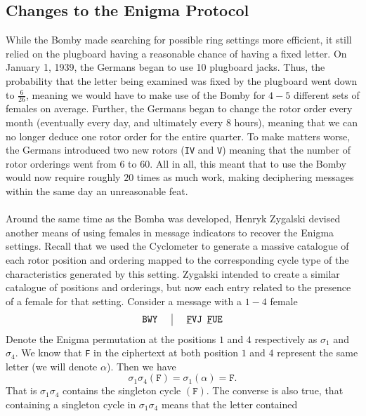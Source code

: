 \subsection{Changes to the Enigma Protocol}
While the Bomby made searching for possible ring settings more
efficient, it still relied on the plugboard having a reasonable
chance of having a fixed letter. On January 1, 1939, the Germans
began to use 10 plugboard jacks. Thus, the probability that the letter
being examined was fixed by the plugboard went down to $\frac{6}{26}$,
meaning we would have to make use of the Bomby for $4-5$ different
sets of females on average. Further, the Germans began to change the
rotor order every month (eventually every day, and ultimately
every 8 hours), meaning that we can no longer deduce one rotor order
for the entire quarter. To make matters worse, the Germans introduced
two new rotors (\texttt{IV} and \texttt{V}) meaning that the number
of rotor orderings went from $6$ to $60$. All in all, this meant that
to use the Bomby would now require roughly $20$ times as much work,
making deciphering messages within the same day an unreasonable feat.
\\\\Around the same time as the Bomba was developed, Henryk Zygalski
devised another means of using females in message indicators to
recover the Enigma settings. Recall that we used the Cyclometer to
generate a massive catalogue of each rotor position and ordering
mapped to the corresponding cycle type of the characteristics generated by
this setting. Zygalski intended to create a similar catalogue of
positions and orderings, but now each entry related to the presence of
a female for that setting. Consider a message with a $1-4$ female
\[
  \setlength{\arraycolsep}{15pt}
  \begin{array}{c | c}
    \texttt{BWY} & {\uline{\texttt{F}}}\texttt{VJ
    }{\uline{\texttt{F}}}\texttt{UE}              \\
  \end{array}
\]
Denote the Enigma permutation at the positions $1$ and $4$
respectively as $\sigma_1$ and $\sigma_4$. We know that \texttt{F} in
the ciphertext at both position $1$ and $4$ represent the same letter
(we will denote $\alpha$). Then we have
\[
  \sigma_1\sigma_4(\texttt{F}) = \sigma_1(\alpha) = \texttt{F}.
\]
That is $\sigma_1\sigma_4$ contains the singleton cycle
$(\texttt{F})$. The converse is also true, that containing a
singleton cycle in $\sigma_1\sigma_4$ means that the letter contained
